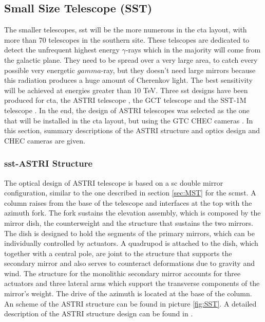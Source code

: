 \documentclass[main.tex]{subfiles}
\begin{document}
\subsection{Small Size Telescope (SST)}

The smaller telescopes, \gls{sst} will be the more numerous in the \gls{cta} layout, with more than 70 telescopes in the southern site. These telscopes are dedicated to detect the unfrequent highest energy $\gamma$-rays which in the majority will come from the galactic plane. They need to be spread over a very large area, to catch every possible very energetic $gamma$-ray, but they doesn't need large mirrors because this radiation produces a huge amount of Cherenkov light. The best sensitivity will be achieved at energies greater than 10 TeV. Three \gls{sst} designs have been produced  for \gls{cta}, the ASTRI telescope \cite{2017ASTRItels}, the GCT telescope \cite{2017CHECtels} and the SST-1M telescope \cite{2017SST1M}. In the end, the design of ASTRI telescopes was selected as the one that will be installed in the \gls{cta} layout, but using the GTC CHEC cameras \cite{2017CHECcam}. In this section, summary descriptions of the ASTRI structure and optics design and CHEC cameras are given.

\subsubsection{\gls{sst}-ASTRI Structure}

The optical design of ASTRI telescope is based on a \gls{sc} double mirror configuration, similar to the one described in section \ref{sec:MST} for the \gls{scmst}. A column raises from the base of the telescope and interfaces at the top with the azimuth fork. The fork sustains the elevation assembly, which is composed by the mirror dish, the counterweight and the structure that sustains the two mirrors. The dish is designed to hold the segments of the primary mirrors, which can be individually controlled by actuators. A quadrupod is attached to the dish, which together with a central pole, are joint to the structure that supports the secondary mirror and also serves to counteract deformations due to gravity and wind. The structure for the monolithic secondary mirror accounts for three actuators and three lateral arms which support the transverse components of the mirror's weight. The drive of the azimuth is located at the base of the column. An scheme of the ASTRI structure can be found in picture \ref{fig:SST}. A detailed description of the ASTRI structure design can be found in \cite{2013SSTstruct}.
\end{document}
